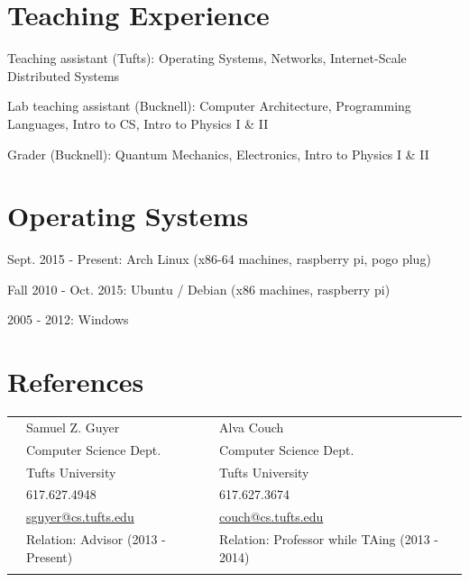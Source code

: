 \documentclass[margin,line]{res}                          %
\newenvironment{list1}{
  \begin{list}{\ding{113}}{%
      \setlength{\itemsep}{0in}
      \setlength{\parsep}{0in} \setlength{\parskip}{0in}
      \setlength{\topsep}{0in} \setlength{\partopsep}{0in}
      \setlength{\leftmargin}{0.17in}}}{\end{list}}
\begin{document}
\begin{resume}
\section{\sc Teaching Experience}
\begin{list1}
\item[] Teaching assistant (Tufts): Operating Systems, Networks, Internet-Scale Distributed Systems
\item[] Lab teaching assistant (Bucknell): Computer Architecture, Programming Languages, Intro to CS,
        Intro to Physics I \& II
\item[] Grader (Bucknell): Quantum Mechanics, Electronics, Intro to Physics I \& II
\end{list1}

\section{\sc Operating Systems}
\begin{list1}
\item[] Sept. 2015 - Present: Arch Linux (x86-64 machines, raspberry pi, pogo plug)
\item[] Fall 2010 - Oct. 2015: Ubuntu / Debian (x86 machines, raspberry pi)
\item[] 2005 - 2012: Windows
\end{list1}

\section{\sc References}
\vspace{.05in}
\begin{tabular}{@{}p{0.20in}p{2.5in}p{3in}}
& Samuel Z. Guyer                      & Alva Couch \\
& Computer Science Dept.               & Computer Science Dept. \\
& Tufts University                     & Tufts University \\
& 617.627.4948                         & 617.627.3674 \\
& \href{mailto:sguyer@cs.tufts.edu}{sguyer@cs.tufts.edu} & \href{mailto:couch@cs.tufts.edu}{couch@cs.tufts.edu} \\
& Relation: Advisor (2013 - Present)   & Relation: Professor while TAing (2013 - 2014) \\
&                                      & \\
\end{tabular}

\end{resume}
\end{document}
